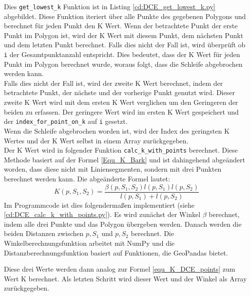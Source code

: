 {	Dies \lstinline|get_lowest_k| Funktion ist in Listing \ref{cd:DCE_get_lowest_k.py} abgebildet. Diese Funktion iteriert über alle Punkte des gegebenen Polygons und berechnet für jeden Punkt den K Wert. Wenn der betrachtete Punkt der erste Punkt im Polygon ist, wird der K Wert mit diesem Punkt, dem nächsten Punkt und dem letzten Punkt berechnet. Falls dies nicht der Fall ist, wird überprüft ob \lstinline|i| der Gesamtpunktanzahl entspricht. Dies bedeutet, dass der K Wert für jeden Punkt im Polygon berechnet wurde, woraus folgt, dass die Schleife abgebrochen werden kann. \\
	Falls dies nicht der Fall ist, wird der zweite K Wert berechnet, indem der betrachtete Punkt, der nächste und der vorherige Punkt genutzt wird. Dieser zweite K Wert wird mit dem ersten K Wert verglichen um den Geringeren der beiden zu erfassen. Der geringere Wert wird im ersten K Wert gespeichert und der \lstinline|index_for_point_on_k| auf \lstinline|i| gesetzt. \\
	
	Wenn die Schleife abgebrochen worden ist, wird der Index des geringsten K Wertes und der K Wert selbst in einem Array zurückgegeben.\\

	Der K Wert wird in folgender Funktion \lstinline|calc_k_with_points| berechnet. Diese Methode basiert auf der Formel \ref{Equ_K_Bark} und ist dahingehend abgeändert worden, dass diese nicht mit Liniensegmenten, sondern mit drei Punkten berechnet werden kann. Die abgeänderte Formel lautet:
	\begin{equation}
		K(p,S_1,S_2) = \frac{\beta(p, S_1, S_2)l(p, S_1)l(p, S_2)}{l(p, S_1) + l(p, S_2)} 
		\label{equ_K_DCE_points}
	\end{equation}
	Im Programmcode ist dies folgendermaßen implementiert (siehe \ref{cd:DCE_calc_k_with_points.py}). Es wird zunächst der Winkel $\beta$ berechnet, indem alle drei Punkte und das Polygon übergeben werden. Danach werden die beiden Distanzen zwischen $p, S_1$ und $p, S_2$ berechnet. Die Winkelberechnungsfunktion arbeitet mit NumPy und die Distanzberechnungsfunktion basiert auf Funktionen, die GeoPandas bietet.
	
	Diese drei Werte werden dann analog zur Formel \ref{equ_K_DCE_points} zum Wert K berechnet. Als letzten Schritt wird dieser Wert und der Winkel als Array zurückgegeben.
	
}

